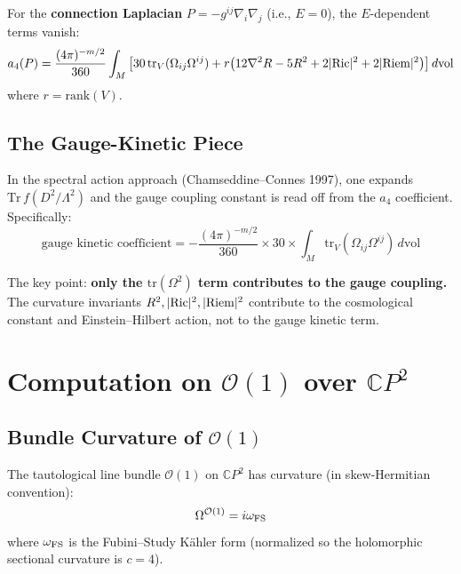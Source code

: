 \documentclass[12pt,a4paper]{article}
\theoremstyle{definition}
\begin{document}
For the \textbf{connection Laplacian} $P = -g^{ij}\nabla_i\nabla_j$
(i.e., $E = 0$), the $E$-dependent terms vanish:
\begin{equation}\label{eq:a4-conn-lap}
a_4(P) = \frac{(4\pi)^{-m/2}}{360}\int_M \left[
30\,\mathrm{tr}_V(\Omega_{ij}\Omega^{ij})
+ r\bigl(12\nabla^2 R - 5R^2 + 2|{\rm Ric}|^2 + 2|{\rm Riem}|^2\bigr)
\right]d\mathrm{vol}
\end{equation}
where $r = \mathrm{rank}(V)$.

\subsection{The Gauge-Kinetic Piece}

In the spectral action approach (Chamseddine--Connes 1997), one
expands $\mathrm{Tr}\,f(D^2/\Lambda^2)$ and the gauge coupling
constant is read off from the $a_4$ coefficient.  Specifically:
\begin{equation}\label{eq:gauge-kinetic-def}
\text{gauge kinetic coefficient} = -\frac{(4\pi)^{-m/2}}{360}
\times 30 \times \int_M \mathrm{tr}_V(\Omega_{ij}\Omega^{ij})\,d\mathrm{vol}
\end{equation}

The key point: \textbf{only the $\mathrm{tr}(\Omega^2)$ term contributes
to the gauge coupling.}  The curvature invariants
$R^2, |{\rm Ric}|^2, |{\rm Riem}|^2$ contribute to the
cosmological constant and Einstein--Hilbert action, not to the
gauge kinetic term.

\section{Computation on $\mathcal{O}(1)$ over $\mathbb{C}P^2$}
\label{sec:O1}

\subsection{Bundle Curvature of $\mathcal{O}(1)$}

The tautological line bundle $\mathcal{O}(1)$ on $\mathbb{C}P^2$ has
curvature (in skew-Hermitian convention):
\begin{equation}
\Omega^{\mathcal{O}(1)} = i\omega_{\rm FS}
\end{equation}
where $\omega_{\rm FS}$ is the Fubini--Study K\"ahler form (normalized
so the holomorphic sectional curvature is $c = 4$).
\end{document}
